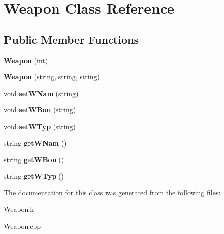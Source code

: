 \hypertarget{class_weapon}{}\section{Weapon Class Reference}
\label{class_weapon}
\subsection*{Public Member Functions}
\begin{DoxyCompactItemize}
\item 
\hypertarget{class_weapon_a58073efa57ceb895524ff6d6ac9e7cd2}{}{\bfseries Weapon} (int)\label{class_weapon_a58073efa57ceb895524ff6d6ac9e7cd2}

\item 
\hypertarget{class_weapon_a82b5ccae66471ec73724ec851605b053}{}{\bfseries Weapon} (string, string, string)\label{class_weapon_a82b5ccae66471ec73724ec851605b053}

\item 
\hypertarget{class_weapon_a0b27bfcefcb412059583fef6cae5d79b}{}void {\bfseries set\+W\+Nam} (string)\label{class_weapon_a0b27bfcefcb412059583fef6cae5d79b}

\item 
\hypertarget{class_weapon_afc4aff58ba56a4d02271e8c24865cd55}{}void {\bfseries set\+W\+Bon} (string)\label{class_weapon_afc4aff58ba56a4d02271e8c24865cd55}

\item 
\hypertarget{class_weapon_aa4e777da51fb31117d9dd9671ccab9a1}{}void {\bfseries set\+W\+Typ} (string)\label{class_weapon_aa4e777da51fb31117d9dd9671ccab9a1}

\item 
\hypertarget{class_weapon_aadca77a1073527cf5d9455d6a154130d}{}string {\bfseries get\+W\+Nam} ()\label{class_weapon_aadca77a1073527cf5d9455d6a154130d}

\item 
\hypertarget{class_weapon_a0544d20db5d22fd2c83f4b716438c281}{}string {\bfseries get\+W\+Bon} ()\label{class_weapon_a0544d20db5d22fd2c83f4b716438c281}

\item 
\hypertarget{class_weapon_a64b107855e5dc16142927ad92e72ab1f}{}string {\bfseries get\+W\+Typ} ()\label{class_weapon_a64b107855e5dc16142927ad92e72ab1f}

\end{DoxyCompactItemize}


The documentation for this class was generated from the following files\+:\begin{DoxyCompactItemize}
\item 
Weapon.\+h\item 
Weapon.\+cpp\end{DoxyCompactItemize}
